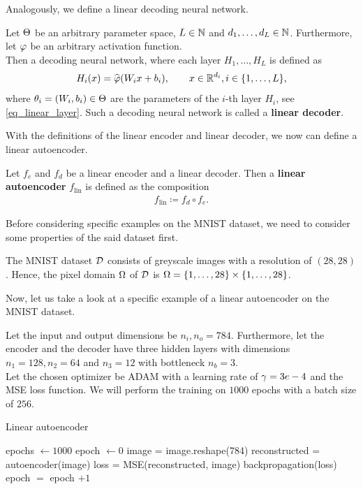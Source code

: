 Analogously, we define a linear decoding neural network.

\begin{definition}\label{def_linear_decoder}
Let $\operatorname{\Theta}$ be an arbitrary parameter space, $L\in \operatorname{\mathbb{N}}$ and $d_1,\ldots,d_L \in \operatorname{\mathbb{N}}$. Furthermore, let $\operatorname{\varphi}$ be an arbitrary activation function.\\
Then a decoding neural network, where each layer $H_1,\ldots, H_L$ is defined as
\begin{align*}
H_i(x) = \widehat{\operatorname{\varphi}}(W_ix + b_i), \qquad x \in \operatorname{\mathbb{R}}^{d_i}, i \in \{1,\ldots, L\},
\end{align*}
where $\theta_i=(W_i, b_i)\in\operatorname{\Theta}$ are the parameters of the $i$-th layer $H_i$, see \eqref{eq_linear_layer}. Such a decoding neural network is called a \textbf{linear decoder}.
\end{definition}


With the definitions of the linear encoder and linear decoder, we now can define a linear autoencoder.


\begin{definition}
Let $f_e$ and $f_d$ be a linear encoder and a linear decoder. Then a \textbf{linear autoencoder} $f_{\text{lin}}$ is defined as the composition
\begin{align*}
f_{\text{lin}} \coloneqq f_d \circ f_e.
\end{align*}
\end{definition}


Before considering specific examples on the MNIST dataset, we need to consider some properties of the said dataset first.


\begin{proposition}\label{def:mnist}
The MNIST dataset $\operatorname{\mathcal{D}}$ consists of greyscale images with a resolution of $(28,28)$. Hence, the pixel domain $\Omega$ of $\operatorname{\mathcal{D}}$ is $\Omega=\{1,\ldots,28\}\times\{1,\ldots,28\}$.
\end{proposition}


Now, let us take a look at a specific example of a linear autoencoder on the MNIST dataset.


\begin{algorithm}
Let the input and output dimensions be $n_i, n_o = 784$. Furthermore, let the encoder and the decoder have three hidden layers with dimensions $n_1 = 128, n_2=64$ and $n_3 = 12$ with bottleneck $n_b = 3$.\\
Let the chosen optimizer be ADAM with a learning rate of $\operatorname{\gamma}=3e-4$ and the MSE loss function. We will perform the training on $1000$ epochs with a batch size of $256$.
\caption{Linear autoencoder}\label{alg:linAE}
\begin{algorithmic}[1]
\State epochs $\gets 1000$
\State epoch $\gets 0$
		\State image = image.reshape(784) 
	    \State reconstructed = autoencoder(image) 
    	\State loss = MSE(reconstructed, image) 
	    \State backpropagation(loss) 
    \EndFor
    \State epoch $=$ epoch $+1$
\EndFor
\end{algorithmic}
\end{algorithm}
